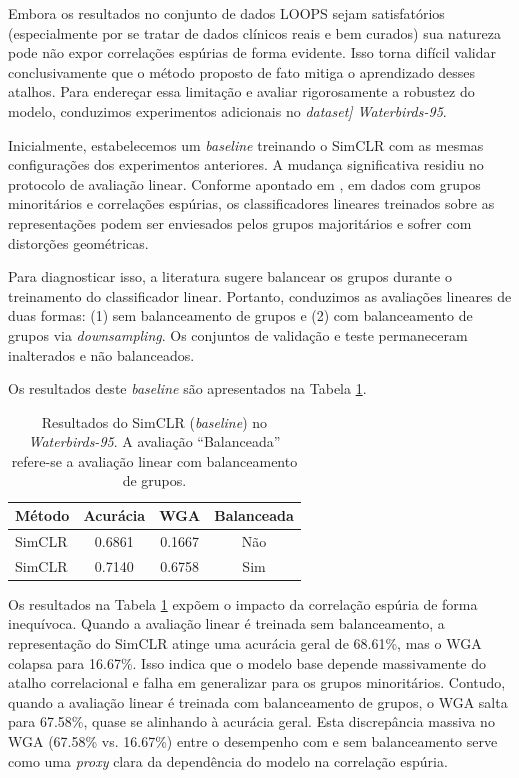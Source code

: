 Embora os resultados no conjunto de dados LOOPS sejam satisfatórios (especialmente por se tratar de dados clínicos reais e bem curados) sua natureza pode não expor correlações espúrias de forma evidente. Isso torna difícil validar conclusivamente que o método proposto de fato mitiga o aprendizado desses atalhos. Para endereçar essa limitação e avaliar rigorosamente a robustez do modelo, conduzimos experimentos adicionais no \textit{dataset] Waterbirds-95}.

Inicialmente, estabelecemos um \textit{baseline} treinando o SimCLR com as mesmas configurações dos experimentos anteriores. A mudança significativa residiu no protocolo de avaliação linear. Conforme apontado em \cite{ssl_spurious_correlation}, em dados com grupos minoritários e correlações espúrias, os classificadores lineares treinados sobre as representações podem ser enviesados pelos grupos majoritários e sofrer com distorções geométricas.

Para diagnosticar isso, a literatura sugere balancear os grupos durante o treinamento do classificador linear. Portanto, conduzimos as avaliações lineares de duas formas: (1) sem balanceamento de grupos e (2) com balanceamento de grupos via \textit{downsampling}. Os conjuntos de validação e teste permaneceram inalterados e não balanceados.

Os resultados deste \textit{baseline} são apresentados na Tabela \ref{tab:waterbirds_baseline}.

\begin{table}[h]
\centering
\caption{Resultados do SimCLR (\textit{baseline}) no \textit{Waterbirds-95}. A avaliação ``Balanceada'' refere-se a avaliação linear com balanceamento de grupos.}
\label{tab:waterbirds_baseline}
\setlength{\tabcolsep}{8pt} %
\begin{tabular}{lccc}
\toprule
Método & Acurácia & WGA & Balanceada \\
\midrule
SimCLR & 0.6861 & 0.1667 & Não \\
SimCLR & 0.7140 & 0.6758 & Sim \\
\bottomrule
\end{tabular}
\end{table}

Os resultados na Tabela \ref{tab:waterbirds_baseline} expõem o impacto da correlação espúria de forma inequívoca. Quando a avaliação linear é treinada sem balanceamento, a representação do SimCLR atinge uma acurácia geral de 68.61\%, mas o WGA colapsa para 16.67\%. Isso indica que o modelo base depende massivamente do atalho correlacional e falha em generalizar para os grupos minoritários. Contudo, quando a avaliação linear é treinada com balanceamento de grupos, o WGA salta para 67.58\%, quase se alinhando à acurácia geral. Esta discrepância massiva no WGA (67.58\% vs. 16.67\%) entre o desempenho com e sem balanceamento serve como uma \textit{proxy} clara da dependência do modelo na correlação espúria. 


